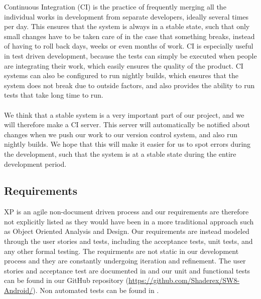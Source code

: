 Continuous Integration (CI) is the practice of frequently merging all the individual works in development from separate developers, ideally several times per day. This ensures that the system is always in a stable state, such that only small changes have to be taken care of in the case that something breaks, instead of having to roll back days, weeks or even months of work. CI is especially useful in test driven development, because the tests can simply be executed when people are integrating their work, which easily ensures the quality of the product. CI systems can also be configured to run nightly builds, which ensures that the system does not break due to outside factors, and also provides the ability to run tests that take long time to run.
\\\\
We think that a stable system is a very important part of our project, and we will therefore make a CI server. This server will automatically be notified about changes when we push our work to our version control system, and also run nightly builds. We hope that this will make it easier for us to spot errors during the development, such that the system is at a stable state during the entire development period. 

\subsection{Requirements}

XP is an agile non-document driven process and our requirements are therefore not explicitly listed as they would have been in a more traditional approach such as Object Oriented Analysis and Design. Our requirements are instead modeled through the user stories and tests, including the acceptance tests, unit tests, and any other formal testing. The requirments are not static in our development process and they are constantly undergoing iteration and refinement. The user stories and acceptance test are documented in  and our unit and functional tests can be found in our GitHub repository (\href{https://github.com/Shaderex/SW8-Android/}{https://github.com/Shaderex/SW8-Android/}). Non automated tests can be found in .

